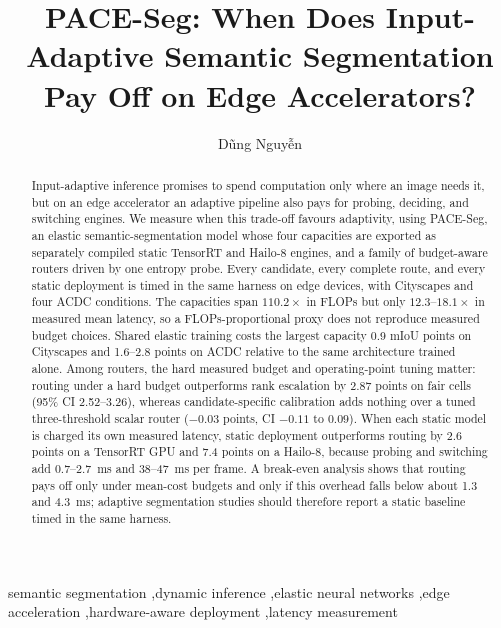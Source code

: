 \documentclass[a4paper,5p]{elsarticle}
\newcommand{\method}{PACE-Seg}
\newcommand{\miou}{mIoU}
\begin{document}
\begin{frontmatter}

\title{PACE-Seg: When Does Input-Adaptive Semantic Segmentation Pay Off on Edge Accelerators?}

\author[aff1]{D\~ung Nguy\~{\^e}n}

\begin{abstract}
Input-adaptive inference promises to spend computation only where an image needs it, but on an edge accelerator an adaptive pipeline also pays for probing, deciding, and switching engines. We measure when this trade-off favours adaptivity, using \method{}, an elastic semantic-segmentation model whose four capacities are exported as separately compiled static TensorRT and Hailo-8 engines, and a family of budget-aware routers driven by one entropy probe. Every candidate, every complete route, and every static deployment is timed in the same harness on edge devices, with Cityscapes and four ACDC conditions. The capacities span $110.2\times$ in FLOPs but only $12.3$--$18.1\times$ in measured mean latency, so a FLOPs-proportional proxy does not reproduce measured budget choices. Shared elastic training costs the largest capacity 0.9 \miou{} points on Cityscapes and 1.6--2.8 points on ACDC relative to the same architecture trained alone. Among routers, the hard measured budget and operating-point tuning matter: routing under a hard budget outperforms rank escalation by 2.87 points on fair cells (95\% CI 2.52--3.26), whereas candidate-specific calibration adds nothing over a tuned three-threshold scalar router ($-0.03$ points, CI $-0.11$ to $0.09$). When each static model is charged its own measured latency, static deployment outperforms routing by 2.6 points on a TensorRT GPU and 7.4 points on a Hailo-8, because probing and switching add 0.7--2.7~ms and 38--47~ms per frame. A break-even analysis shows that routing pays off only under mean-cost budgets and only if this overhead falls below about 1.3 and 4.3~ms; adaptive segmentation studies should therefore report a static baseline timed in the same harness.
\end{abstract}

\begin{keyword}
semantic segmentation \sep dynamic inference \sep elastic neural networks \sep edge acceleration \sep hardware-aware deployment \sep latency measurement
\end{keyword}

\end{frontmatter}
\end{document}
